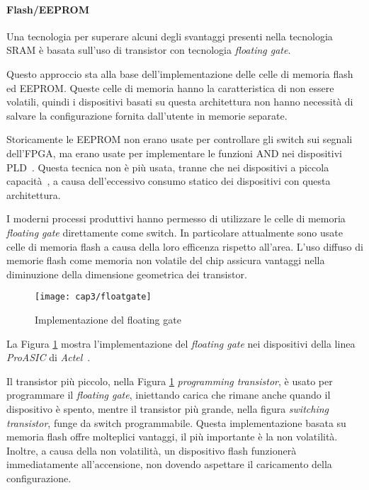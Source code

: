 \paragraph{Flash/EEPROM}
Una tecnologia per superare alcuni degli svantaggi presenti nella tecnologia SRAM è basata sull'uso di transistor con tecnologia \textit{floating gate}. 

Questo approccio sta alla base dell'implementazione delle celle di memoria flash ed EEPROM. Queste celle di memoria hanno la caratteristica di non essere volatili, quindi i dispositivi basati su questa architettura non hanno necessità di salvare la configurazione fornita dall'utente in memorie separate.

Storicamente le EEPROM non erano usate per controllare gli switch sui segnali dell'FPGA, ma erano usate per implementare le funzioni AND nei dispositivi PLD~\cite{fpgabook}. Questa tecnica non è più usata, tranne che nei dispositivi a piccola capacità~\cite{cpldxilinx}, a causa dell'eccessivo consumo statico dei dispositivi con questa architettura.

I moderni processi produttivi hanno permesso di utilizzare le celle di memoria \textit{floating gate} direttamente come switch. In particolare attualmente sono usate celle di memoria flash a causa della loro efficenza rispetto all'area. L'uso diffuso di memorie flash come memoria non volatile del chip assicura vantaggi nella diminuzione della dimensione geometrica dei transistor.

\begin{figure}  
  \begin{center}
    \texttt{[image: cap3/floatgate]}
    \caption{Implementazione del floating gate}
    \label{floatgate}
  \end{center}
\end{figure}

La Figura \ref{floatgate} mostra l'implementazione del \textit{floating gate} nei dispositivi della linea \textit{ProASIC} di \textit{Actel}~\cite{actelpro}. 

Il transistor più piccolo, nella Figura \ref{floatgate} \textit{programming transistor}, è usato per programmare il \textit{floating gate}, iniettando carica che rimane anche quando il dispositivo è spento, mentre il transistor più grande, nella figura \textit{switching transistor}, funge da switch programmabile. Questa implementazione basata su memoria flash offre molteplici vantaggi, il più importante è la non volatilità. Inoltre, a causa della non volatilità, un dispositivo flash funzionerà immediatamente all'accensione, non dovendo aspettare il caricamento della configurazione.

